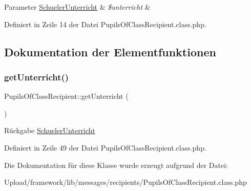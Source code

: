 \begin{DoxyParams}[1]{Parameter}
\mbox{\hyperlink{class_schueler_unterricht}{Schueler\+Unterricht}} & {\em \$unterricht} & \\
\hline
\end{DoxyParams}


Definiert in Zeile 14 der Datei Pupils\+Of\+Class\+Recipient.\+class.\+php.



\subsection{Dokumentation der Elementfunktionen}
\mbox{\label{class_pupils_of_class_recipient_a293fad7179cdf4195e11c3b6952aa84f}} 
\subsubsection{\texorpdfstring{get\+Unterricht()}{getUnterricht()}}
{\footnotesize\ttfamily Pupils\+Of\+Class\+Recipient\+::get\+Unterricht (\begin{DoxyParamCaption}{ }\end{DoxyParamCaption})}

\begin{DoxyReturn}{Rückgabe}
\mbox{\hyperlink{class_schueler_unterricht}{Schueler\+Unterricht}} 
\end{DoxyReturn}


Definiert in Zeile 49 der Datei Pupils\+Of\+Class\+Recipient.\+class.\+php.



Die Dokumentation für diese Klasse wurde erzeugt aufgrund der Datei\+:\begin{DoxyCompactItemize}
\item 
Upload/framework/lib/messages/recipients/Pupils\+Of\+Class\+Recipient.\+class.\+php\end{DoxyCompactItemize}
